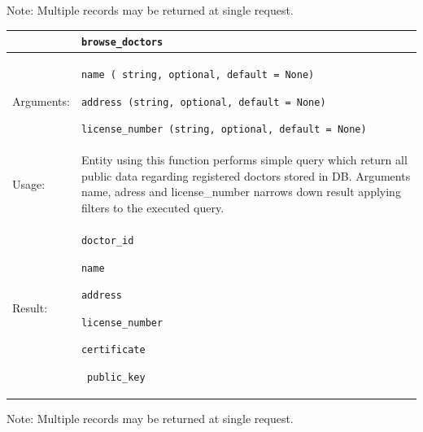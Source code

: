 Note: Multiple records may be returned at single request.
    \begin{longtable}{| p{3cm} | p{10.75cm} |}
    \hline
     & \texttt{browse\_doctors} \\ \hline
    Arguments: &  \begin{packed_enum}
    	\item \texttt{name ( string, optional, default = None)}
		\item \texttt{address (string, optional, default = None)}
		\item \texttt{license\_number (string, optional, default = None)}

	\end{packed_enum}     \\ \hline
    Usage: & Entity using this function performs simple query which return all public data regarding registered doctors stored in DB. Arguments name, adress and license\_number narrows down result applying filters to the executed query. \\ \hline
    Result: & \begin{packed_enum}
    	\item \texttt{doctor\_id}
		\item \texttt{name}
		\item \texttt{address}
		\item \texttt{license\_number}
		\item \texttt{certificate}
		\item\texttt{ public\_key}
	\end{packed_enum}     \\ \hline	
    \end{longtable}

Note: Multiple records may be returned at single request.

\newpage

